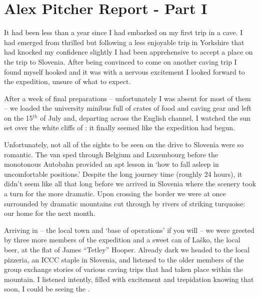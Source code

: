 \section{Alex Pitcher Report - Part I}


It had been less than a year since I had embarked on my first trip in a
cave. I had emerged from  thrilled but following a less enjoyable trip in Yorkshire that had knocked my confidence slightly I had been apprehensive to accept a place on the trip to Slovenia. After being convinced to come on another caving trip I found myself hooked and it was with a nervous excitement I looked forward to the expedition, unsure of what to expect.

After a week of final preparations -- unfortunately I was absent for most
of them -- we loaded the university minibus full of crates of food and
caving gear and left  on the 15\(^{th}\) of July and, departing
across the English channel, I watched the sun set over the white cliffs
of : it finally seemed like the expedition had begun.

Unfortunately, not all of the sights to be seen on the drive to Slovenia
were so romantic. The van sped through Belgium and Luxembourg before the
monotonous Autobahn provided an apt lesson in `how to fall asleep in
uncomfortable positions.' Despite the long journey time (roughly 24
hours), it didn't seem like all that long before we arrived in Slovenia
where the scenery took a turn for the more dramatic. Upon crossing the
border we were at once surrounded by dramatic mountains cut through by
rivers of striking turquoise: our home for the next month.

Arriving in  -- the local town and `base of operations' if you will --
we were greeted by three more members of the expedition and a sweet can
of Laško, the local beer, at the flat of James ``Tetley'' Hooper.
Already dark we headed to the local pizzeria, an ICCC staple in
Slovenia, and listened to the older members of the group exchange
stories of various caving trips that had taken place within the
mountain. I listened intently, filled with excitement and trepidation
knowing that soon, I could be seeing the .

